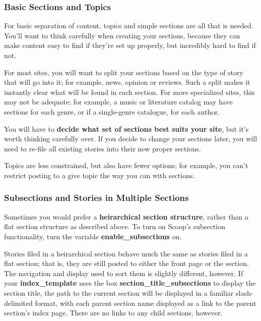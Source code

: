 \subsubsection{Basic Sections and Topics}
\label{sections-basic}

For basic separation of content, topics and simple sections are all that is needed.  You'll want to think carefully when creating your sections, because they can make content easy to find if they're set up properly, but incredibly hard to find if not.

For most sites, you will want to split your sections based on the type of story that will go into it; for example, news, opinion or reviews.  Such a split makes it instantly clear what will be found in each section.  For more specialized sites, this may not be adequate; for example, a music or literature catalog may have sections for each genre, or if a single-genre catalogue, for each author.

You will have to {\bf decide what set of sections best suits your site}, but it's worth thinking carefully over.  If you decide to change your sections later, you will need to re-file all existing stories into their new proper sections.

Topics are less constrained, but also have fewer options; for example, you can't restrict posting to a give topic the way you can with sections.

\subsubsection{Subsections and Stories in Multiple Sections}
\label{sections-subsections}

Sometimes you would prefer a {\bf heirarchical section structure}, rather than a flat section structure as described above.  To turn on Scoop's subsection functionality, turn the variable {\bf enable\_subsections} on.

Stories filed in a heirarchical section behave much the same as stories filed in a flat section; that is, they are still posted to either the front page or the section.  The navigation and display used to sort them is slightly different, however.  If your {\bf index\_template} uses the box {\bf section\_title\_subsections} to display the section title, the path to the current section will be displayed in a familiar slash-delimited format, with each parent section name displayed as a link to the parent section's index page.  There are no links to any child sections, however.

